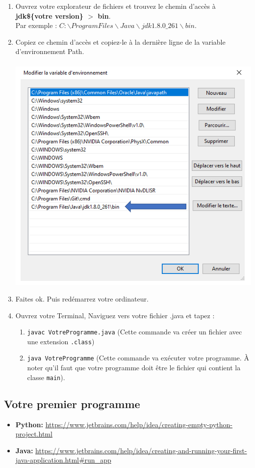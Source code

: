 \begin{enumerate}
    \item Ouvrez votre explorateur de fichiers et trouvez le chemin d'accès à \textbf{jdk\$\{votre version\} $>$ bin}. \\Par exemple : $C:\backslash Program Files\backslash Java\backslash jdk1.8.0\_261\backslash bin.$\\
    \item Copiez ce chemin d'accès et copiez-le à la dernière ligne de la variable d'environnement Path.\\\
    \includegraphics[width=15cm]{img/Res3.PNG}\\
    \item Faites ok. Puis redémarrez votre ordinateur.
    \item Ouvrez votre Terminal, Naviguez vers votre fichier .java et tapez :
        \begin{enumerate}
            \item \lstinline{javac VotreProgramme.java} (Cette commande va créer un fichier avec une extension \lstinline{.class})
            \item \lstinline{java VotreProgramme} (Cette commande va exécuter votre programme. À noter qu'il faut que votre programme doit être le fichier qui contient la classe \lstinline{main}).
        \end{enumerate}
    
\end{enumerate}


\subsection*{Votre premier programme}

\begin{itemize}
    \item \textbf{Python: }\url{https://www.jetbrains.com/help/idea/creating-empty-python-project.html}
    \item \textbf{Java: }\url{https://www.jetbrains.com/help/idea/creating-and-running-your-first-java-application.html#run_app}
\end{itemize}


